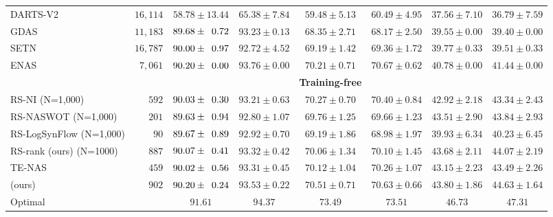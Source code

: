 \documentclass[sigconf]{acmart}
\begin{document}
\begin{table*}[htb]
\begin{tabular}{@{}lrcccccc@{}}
        DARTS-V2            & $16,114$ & $58.78 \pm 13.44$    & $65.38 \pm 7.84$ & $59.48 \pm 5.13$ & $60.49 \pm 4.95$ & $37.56 \pm 7.10$ & $36.79 \pm 7.59$ \\
        GDAS                & $11,183$ & $89.68 \pm \z{0.72}$ & $93.23 \pm 0.13$ & $68.35 \pm 2.71$ & $68.17 \pm 2.50$ & $39.55 \pm 0.00$ & $39.40 \pm 0.00$ \\
        SETN                & $16,787$ & $90.00 \pm \z{0.97}$ & $92.72 \pm 4.52$ & $69.19 \pm 1.42$ & $69.36 \pm 1.72$ & $39.77 \pm 0.33$ & $39.51 \pm 0.33$ \\
        ENAS                & $7,061$  & $90.20 \pm \z{0.00}$ & $93.76 \pm 0.00$ & $70.21 \pm 0.71$ & $70.67 \pm 0.62$ & $40.78 \pm 0.00$ & $41.44 \pm 0.00$ \\ \midrule
                            &          &                      &                  & \textbf{Training-free} &                &                  &                  \\
        RS-NI (N=1,000)         & $592$  & $90.03 \pm \z{0.30}$ & $93.21 \pm 0.63$ & $70.27 \pm 0.70$ & $70.40 \pm 0.84$ & $42.92 \pm 2.18$ & $43.34 \pm 2.43$ \\ 
        RS-NASWOT (N=1,000)     & $201$  & $89.63 \pm \z{0.94}$ & $92.80 \pm 1.07$ & $69.76 \pm 1.25$ & $69.66 \pm 1.23$ & $43.51 \pm 2.90$ & $43.84 \pm 2.93$ \\ 
        RS-LogSynFlow (N=1,000) & $90$   & $89.67 \pm \z{0.89}$ & $92.92 \pm 0.70$ & $69.19 \pm 1.86$ & $68.98 \pm 1.97$ & $39.93 \pm 6.34$ & $40.23 \pm 6.45$ \\ 
        RS-rank (ours) (N=1000) & $887$  & $90.07 \pm \z{0.41}$ & $93.32 \pm 0.42$ & $70.06 \pm 1.34$ & $70.10 \pm 1.45$ & $43.68 \pm 2.11$ & $44.07 \pm 2.19$ \\ 
        TE-NAS                  & $459$  & $90.02 \pm \z{0.56}$ & $93.31 \pm 0.45$ & $70.12 \pm 1.04$ & $70.26 \pm 1.07$ & $43.15 \pm 2.23$ & $43.49 \pm 2.26$ \\
        \palg{} (ours)          & $902$  & $90.20 \pm \z{0.24}$ & $93.53 \pm 0.22$ & $70.51 \pm 0.71$ & $70.63 \pm 0.66$ & $43.80 \pm 1.86$ & $44.63 \pm 1.64$ \\ \midrule
        Optimal             &          & $91.61$              & $94.37$          & $73.49$          & $73.51$          & $46.73$          & $47.31$          \\ \bottomrule
        \end{tabular}
        \label{table:overall_201}
        \vspace{-\baselineskip}
    \end{table*}
\end{document}
